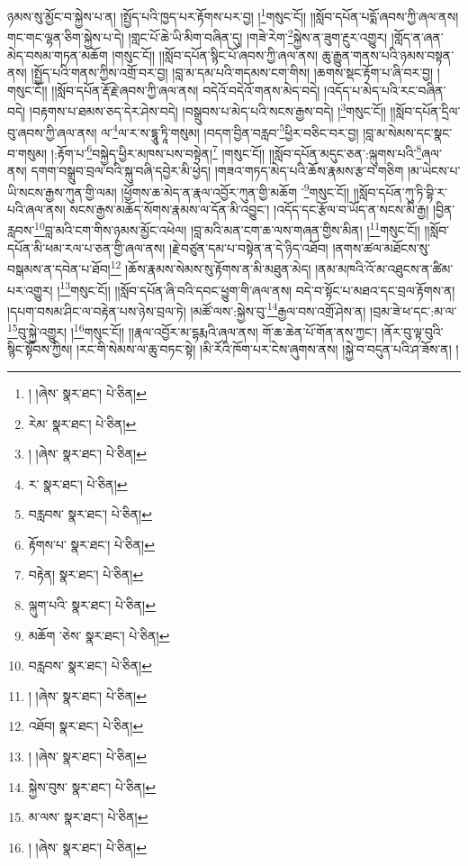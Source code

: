 ཉམས་སུ་མྱོང་བ་སྐྱེས་པ་ན། །སྤྱོད་པའི་ཁྱད་པར་རྟོགས་པར་བྱ། །\footnote{། །ཞེས་  སྣར་ཐང་།  པེ་ཅིན། }གསུང་ངོ།། །།སློབ་དཔོན་པདྨོ་ཞབས་ཀྱི་ཞལ་ནས། གང་གང་ལྷན་ཅིག་སྐྱེས་པ་དེ། །གླང་པོ་ཆེ་ཡི་མིག་བཞིན་དུ། །གཟེ་རེག་\footnote{རེམ་  སྣར་ཐང་།  པེ་ཅིན། }སྐྱེས་ན་ཟུག་རྔུར་འགྱུར། །གློད་ན་ཞན་མེད་བསམ་གཏན་མཆོག །གསུང་ངོ།། །།སློབ་དཔོན་སྙིང་པོ་ཞབས་ཀྱི་ཞལ་ནས། ཆུ་རྒྱུན་གནས་པའི་ཉམས་བསྟན་ནས། །སྤྱོད་པའི་གནས་ཀྱིས་འགྲོ་བར་བྱ། །བླ་མ་དམ་པའི་གདམས་ངག་གིས། །ཆགས་སྡང་རྟོག་པ་ཞི་བར་བྱ། །གསུང་ངོ།། །།སློབ་དཔོན་རྡོ་རྗེ་ཞབས་ཀྱི་ཞལ་ནས། བདེའོ་བདེའོ་གནས་མེད་བདེ། །འདོད་པ་མེད་པའི་རང་བཞིན་བདེ། །བརྟགས་པ་ཐམས་ཅད་དེར་ཤེས་བདེ། །བསྒྲུབས་པ་མེད་པའི་སངས་རྒྱས་བདེ། །\footnote{། །ཞེས་  སྣར་ཐང་།  པེ་ཅིན། }གསུང་ངོ།། །།སློབ་དཔོན་དྲིལ་བུ་ཞབས་ཀྱི་ཞལ་ནས། ལ་\footnote{ར་  སྣར་ཐང་།  པེ་ཅིན། }ལ་ར་ས་དྷཱུ་ཏཱི་གསུམ། །བདག་བྱིན་བརླབ་\footnote{བརླབས་  སྣར་ཐང་།  པེ་ཅིན། }ཕྱིར་བཅིང་བར་བྱ། །བླ་མ་སེམས་དང་སྣང་བ་གསུམ། །:རྟོག་པ་\footnote{རྟོགས་པ་  སྣར་ཐང་།  པེ་ཅིན། }བསྐྱེད་ཕྱིར་མཁས་པས་བསྟེན།\footnote{བརྟེན།  སྣར་ཐང་།  པེ་ཅིན། } །གསུང་ངོ།། །།སློབ་དཔོན་མདུང་ཅན་:ལྐུགས་པའི་\footnote{ལྐུག་པའི་  སྣར་ཐང་།  པེ་ཅིན། }ཞལ་ནས། དགག་བསྒྲུབ་བྲལ་བའི་སྐུ་བཞི་དབྱེར་མི་ཕྱེད། །གཟའ་གཏད་མེད་པའི་ཆོས་རྣམས་རྩ་བ་གཅིག །མ་ཡེངས་པ་ཡི་སངས་རྒྱས་ཀུན་གྱི་ལམ། །ཕྱོགས་ཆ་མེད་ན་རྣལ་འབྱོར་ཀུན་གྱི་མཆོག ་\footnote{མཆོག ་ཅེས་  སྣར་ཐང་།  པེ་ཅིན། }གསུང་ངོ།། །།སློབ་དཔོན་ཀུ་ཏི་བྷི་ར་པའི་ཞལ་ནས། སངས་རྒྱས་མཆོད་སོགས་རྣམས་ལ་དོན་མི་འབྱུང་། །འདོད་དང་རྩོལ་བ་ཡོད་ན་སངས་མི་རྒྱ། །བྱིན་རླབས་\footnote{བརླབས་  སྣར་ཐང་།  པེ་ཅིན། }བླ་མའི་ངག་གིས་ཉམས་མྱོང་འཕེལ། །བླ་མའི་མན་ངག་ཆ་ལས་གཞན་གྱིས་མིན། །\footnote{། །ཞེས་  སྣར་ཐང་།  པེ་ཅིན། }གསུང་ངོ།། །།སློབ་དཔོན་མི་ཕམ་རལ་པ་ཅན་གྱི་ཞལ་ནས། །རྗེ་བཙུན་དམ་པ་བསྟེན་ན་དེ་ཉིད་འཐོབ། །ནགས་ཚལ་མཐོངས་སུ་བསྒམས་ན་དབེན་པ་ཐོབ།\footnote{འཐོབ།  སྣར་ཐང་།  པེ་ཅིན། } །ཆོས་རྣམས་སེམས་སུ་རྟོགས་ན་མི་མཐུན་མེད། །ནམ་མཁའི་འོ་མ་འཐུངས་ན་ཚིམ་པར་འགྱུར། །\footnote{། །ཞེས་  སྣར་ཐང་།  པེ་ཅིན། }གསུང་ངོ།། །།སློབ་དཔོན་ཞི་བའི་དབང་ཕྱུག་གི་ཞལ་ནས། བདེ་བ་སྟོང་པ་མཐའ་དང་བྲལ་རྟོགས་ན། །དཔག་བསམ་ཤིང་ལ་བརྟེན་པས་ཉེས་བྲལ་ཏེ། །མཚོ་ལས་:སྐྱེས་བུ་\footnote{སྐྱེས་བུས་  སྣར་ཐང་།  པེ་ཅིན། }རྒྱལ་བས་འགྲོ་ཤེས་ན། །བྲམ་ཟེ་ཕ་དང་:མ་ལ་\footnote{མ་ལས་  སྣར་ཐང་།  པེ་ཅིན། }བུ་སྐྱེ་འགྱུར། །\footnote{། །ཞེས་  སྣར་ཐང་།  པེ་ཅིན། }གསུང་ངོ།། །།རྣལ་འབྱོར་མ་དྷརྨའི་ཞལ་ནས། གོ་ཆ་ཆེན་པོ་གོན་ནས་ཀྱང་། །ནོར་བུ་ལྟ་བུའི་སྙིང་སྟོབས་ཀྱིས། །རང་གི་སེམས་ལ་ཆུ་བཏང་སྟེ། །མི་རོའི་ཁོག་པར་ངེས་ཞུགས་ནས། །སྐྱེ་བ་བདུན་པའི་ཤ་ཟོས་ན། །
